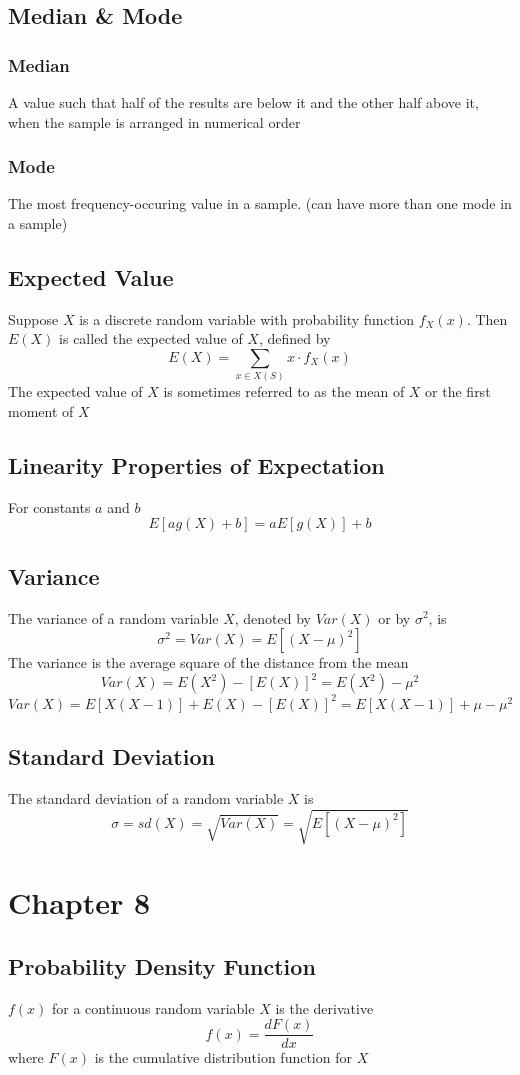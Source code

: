 \documentclass[11pt]{article}
\begin{document}
\subsection{Median \& Mode}
\subsubsection{Median}
A value such that half of the results are below it and the other half above it, when the sample is arranged in numerical order 
\subsubsection{Mode}
The most frequency-occuring value in a sample. (can have more than one mode in a sample)
\subsection{Expected Value}
Suppose $X$ is a discrete random variable with probability function $f_X(x)$. Then $E(X)$ is called the expected value of $X$, defined by 
\[E(X)=\sum_{x\in X(S)}x\cdot f_X(x)\]
The expected value of $X$ is sometimes referred to as the mean of $X$ or the first moment of $X$
\subsection{Linearity Properties of Expectation}
For constants $a$ and $b$ \[E[ag(X)+b] = aE[g(X)]+b\]
\subsection{Variance}
The variance of a random variable $X$, denoted by $Var(X)$ or by $\sigma^2$, is \[\sigma^2=Var(X)=E[(X-\mu)^2]\]
The variance is the average square of the distance from the mean \[Var(X) = E(X^2)-[E(X)]^2=E(X^2)-\mu^2\]\[Var(X)=E[X(X-1)]+E(X)-[E(X)]^2 = E[X(X-1)]+\mu-\mu^2\]
\subsection{Standard Deviation}
The standard deviation of a random variable $X$ is \[\sigma=sd(X)=\sqrt{Var(X)} = \sqrt{E[(X-\mu)^2]}\]

\section{Chapter 8}
\subsection{Probability Density Function}
$f(x)$ for a continuous random variable $X$ is the derivative \[f(x) = \dfrac{dF(x)}{dx}\] where $F(x)$ is the cumulative distribution function for $X$
\end{document}
